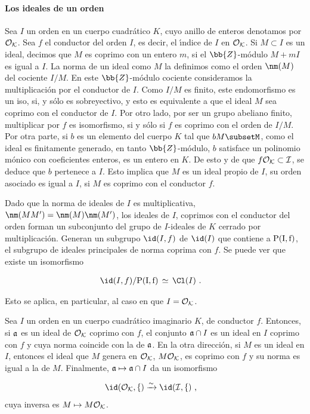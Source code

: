 \paragraph{Los ideales de un orden}

Sea $I$ un orden en un cuerpo cuadr\'{a}tico $K$, cuyo anillo de
enteros denotamos por $\cal{O}_{K}$. Sea $f$ el conductor del orden
$I$, es decir, el \'{\i}ndice de $I$ en $\cal{O}_{K}$. Si
$M\subset I$ es un ideal, decimos que $M$ es coprimo
con un entero $m$, si el $\bb{Z}$-m\'{o}dulo $M+mI$ es igual a
$I$. La norma de un ideal como $M$ la definimos como el orden
$\nm(M)$ del cociente $I/M$. En este $\bb{Z}$-m\'{o}dulo
cociente consideramos la multiplicaci\'{o}n por el conductor de $I$.
Como $I/M$ es finito, este endomorfismo es un iso, si, y
s\'{o}lo es sobreyectivo, y esto es equivalente a que el ideal
$M$ sea coprimo con el conductor de $I$. Por otro lado, por ser
un grupo abeliano finito, multiplicar por $f$ es isomorfismo, si y
s\'{o}lo si $f$ es coprimo con el orden de $I/M$. Por otra
parte, si $b$ es un elemento del cuerpo $K$ tal que
$bM\subsetM$, como el ideal es finitamente generado,
en tanto $\bb{Z}$-m\'{o}dulo, $b$ satisface un polinomio m\'{o}nico
con coeficientes enteros, es un entero en $K$. De esto y de que
$f\cal{O}_{K}\subset I$, se deduce que $b$ pertenece a $I$. Esto
implica que $M$ es un ideal propio de $I$, su orden asociado
es igual a $I$, si $M$ es coprimo con el conductor $f$.

Dado que la norma de ideales de $I$ es multiplicativa,
$\nm(MM')=\nm(M)\nm(M')$, los ideales
de $I$, coprimos con el conductor del orden forman un subconjunto
del grupo de $I$-ideales de $K$ cerrado por multiplicaci\'{o}n.
Generan un subgrupo $\id(I,f)$ de $\id(I)$ que contiene a
$\rm{P}(I,f)$, el subgrupo de ideales principales de norma
coprima con $f$. Se puede ver que existe un isomorfismo

\begin{align*}
\id(I,f)/\rm{P}(I,f) & \,\simeq\,\Cl(I)
\text{ .}
\end{align*}

Esto se aplica, en particular, al caso en que $I=\cal{O}_{K}$.

\begin{propoMaxOrd}
Sea $I$ un orden en un cuerpo cuadr\'{a}tico imaginario $K$,
de conductor $f$. Entonces, si $\frak{a}$ es un ideal de
$\cal{O}_{K}$ coprimo con $f$, el conjunto $\frak{a}\cap I$ es un
ideal en $I$ coprimo con $f$ y cuya norma coincide con la de
$\frak{a}$. En la otra direcci\'{o}n, si $M$ es un ideal en
$I$, entonces el ideal que $M$ genera en $\cal{O}_{K}$,
$M\cal{O}_{K}$, es coprimo con $f$ y su norma es igual a la de
$M$. Finalmente, $\frak{a}\mapsto\frak{a}\cap I$ da un
isomorfismo

\begin{align*}
& \id(\cal{O}_{K},f)\xrightarrow{\sim}\id(I,f)
\text{ ,}
\end{align*}
cuya inversa es $M\mapsto M\cal{O}_{K}$.
\end{propoMaxOrd}

